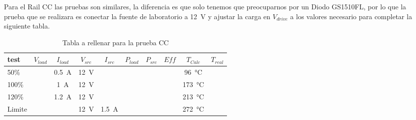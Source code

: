 
Para el Rail CC las pruebas son similares, la diferencia es que solo tenemos que
preocuparnos por un Diodo GS1510FL, por lo que la prueba que se realizara es
conectar la fuente de laboratorio a \SI{12}{\volt} y ajustar la carga en $V_{drive}$
a los valores necesario para completar la siguiente tabla.
\begin{table}[H]
    \centering
    \renewcommand\theadfont{\bfseries}
    \setlength{\tabcolsep}{10pt}
    \renewcommand{\arraystretch}{1.5}
    \begin{tabular}{|l|c|c|c|c|c|c|c|c|c|}
        \hline
        test   & $V_{load}$ & $I_{load}$        & $V_{src}$      & $I_{src}$         & $P_{load}$ & $P_{src}$ & $Eff$ & $T_{Calc}$         & $T_{real}$ \\ \hline
        50\%   &            & \SI{0.5}{\ampere} & \SI{12}{\volt} &                   &            &           &       & \SI{96}{\celsius}  &            \\ \hline
        100\%  &            & \SI{1}{\ampere}   & \SI{12}{\volt} &                   &            &           &       & \SI{173}{\celsius} &            \\ \hline
        120\%  &            & \SI{1.2}{\ampere} & \SI{12}{\volt} &                   &            &           &       & \SI{213}{\celsius} &            \\ \hline
        Limite &            &                   & \SI{12}{\volt} & \SI{1.5}{\ampere} &            &           &       & \SI{272}{\celsius} &            \\
        \hline
    \end{tabular}

    \caption{Tabla a rellenar para la prueba CC}
    \label{tab:CcDataTable}
\end{table}

